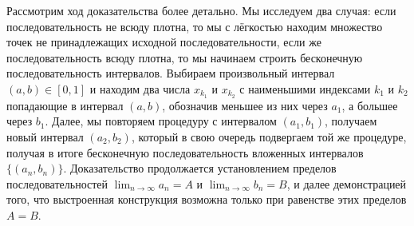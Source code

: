 \documentclass[12pt]{article}
\begin{document}
Рассмотрим ход доказательства более детально. Мы исследуем два случая: если последовательность не всюду плотна, то мы с лёгкостью находим множество точек не принадлежащих исходной последовательности, если же последовательность всюду плотна, то мы начинаем строить бесконечную последовательность интервалов. Выбираем произвольный интервал $(a, b) \in [0, 1]$ и находим два числа $x_{k_1}$ и $x_{k_2}$ с наименьшими индексами $k_1$ и $k_2$ попадающие в интервал $(a, b)$, обозначив меньшее из них через $a_1$, а большее через $b_1$. Далее, мы повторяем процедуру с интервалом $(a_1, b_1)$, получаем новый интервал $(a_2, b_2)$, который в свою очередь подвергаем той же процедуре, получая в итоге бесконечную последовательность вложенных интервалов $\{(a_n, b_n)\}$. Доказательство продолжается установлением пределов последовательностей $\lim_{n\to\infty} a_n = A$ и $\lim_{n\to\infty} b_n = B$, и далее демонстрацией того, что выстроенная конструкция возможна только при равенстве этих пределов $A = B$.
\end{document}
